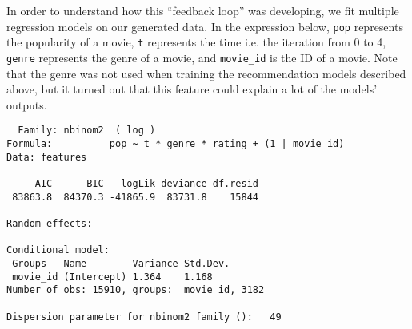 In order to understand how this ``feedback loop'' was developing, we fit
multiple regression models on our generated data. In the expression below,
\verb|pop| represents the popularity of a movie, \verb|t| represents the time
i.e. the iteration from 0 to 4, \verb|genre| represents the genre of a movie,
and \verb|movie_id| is the ID of a movie. Note that the genre was not used when
training the recommendation models described above, but it turned out that this
feature could explain a lot of the models' outputs.

\begin{verbatim}
  Family: nbinom2  ( log )
Formula:          pop ~ t * genre * rating + (1 | movie_id)
Data: features

     AIC      BIC   logLik deviance df.resid
 83863.8  84370.3 -41865.9  83731.8    15844

Random effects:

Conditional model:
 Groups   Name        Variance Std.Dev.
 movie_id (Intercept) 1.364    1.168
Number of obs: 15910, groups:  movie_id, 3182

Dispersion parameter for nbinom2 family ():   49


\end{verbatim}
